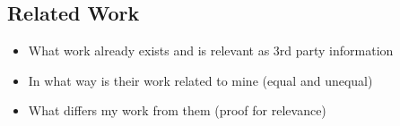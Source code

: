 
\begin{newpage}
	
	\section{Related Work}
		
	\label{sec:related_work}
		\begin{itemize}
			\item What work already exists and is relevant as 3rd party information
			\item In what way is their work related to mine (equal and unequal)
			\item What differs my work from them (proof for relevance)
		\end{itemize}

\end{newpage}